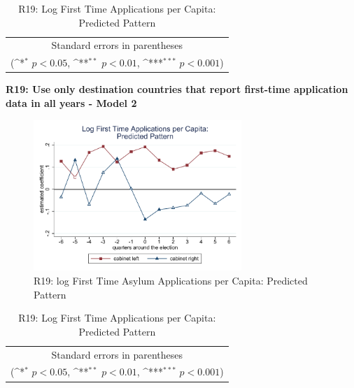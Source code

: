 \documentclass[10pt,a4paper]{scrartcl}
\begin{document}
\begin{table}[!ht]\centering
	\renewcommand{\arraystretch}{1.25}
	\def\sym#1{\ifmmode^{#1}\else\(^{#1}\)\fi}
	\caption{R19: Log First Time Applications per Capita: Predicted Pattern}
	\begin{tabular}{l*{2}{c}}
		\hline\hline
		
		\hline\hline
		\multicolumn{3}{c}{\footnotesize Standard errors in parentheses} \\
		\multicolumn{3}{c}{\footnotesize (\sym{*} \(p<0.05\), \sym{**} \(p<0.01\), \sym{***} \(p<0.001\))}\\
	\end{tabular}
\end{table}

\clearpage
\textbf{R19: Use only destination countries that report first-time application data in all years - Model 2}
\begin{figure}[!ht]
	\centering
	\includegraphics[width=0.7\textwidth]{figures_edited/app_graph2_R19.pdf}
	\caption{R19: log First Time Asylum Applications per Capita: Predicted Pattern}
\end{figure}

\begin{table}[!ht]\centering
	\footnotesize
	\renewcommand{\arraystretch}{1.2}
	\def\sym#1{\ifmmode^{#1}\else\(^{#1}\)\fi}
	\caption{R19: Log First Time Applications per Capita: Predicted Pattern}
	\begin{tabular}{l*{2}{c}}
		\hline\hline
		
		\hline\hline
		\multicolumn{3}{c}{\footnotesize Standard errors in parentheses} \\
		\multicolumn{3}{c}{\footnotesize (\sym{*} \(p<0.05\), \sym{**} \(p<0.01\), \sym{***} \(p<0.001\))} \\
	\end{tabular}
\end{table}
\end{document}
